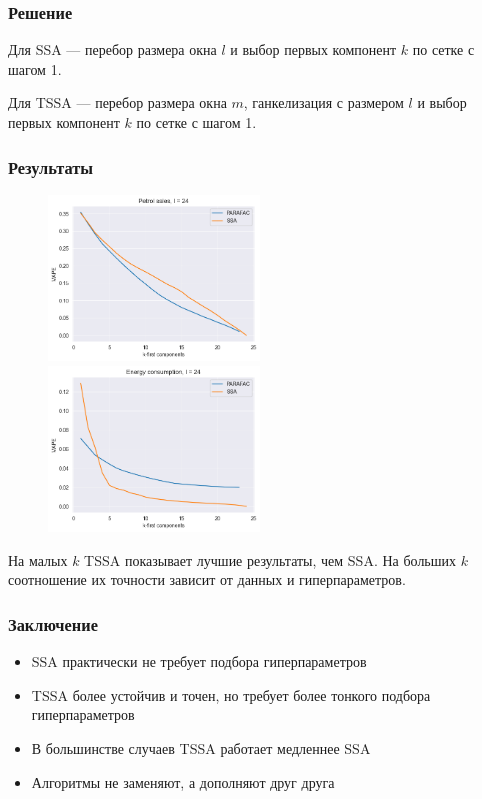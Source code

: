 \documentclass[
	11pt, %
]{beamer}
\begin{document}
\begin{frame}
    \frametitle{Решение}

Для SSA --- перебор размера окна \(l\) и выбор первых компонент \(k\) по сетке с шагом 1.

Для TSSA --- перебор размера окна \(m\), ганкелизация с размером \(l\) и выбор первых компонент \(k\) по сетке с шагом 1.

\end{frame}

\begin{frame}
	\frametitle{Результаты}

\begin{figure}
	\centering
	\includegraphics[width=0.5\textwidth]{images/result_good.png}%
	\includegraphics[width=0.5\textwidth]{images/result_bad.png}
	\label{fig:result}
\end{figure}

На малых \(k\) TSSA показывает лучшие результаты, чем SSA. На больших \(k\) соотношение их точности зависит от данных и гиперпараметров.

\end{frame}


\begin{frame}
	\frametitle{Заключение}

\begin{itemize}
	\item SSA практически не требует подбора гиперпараметров
    \item TSSA более устойчив и точен, но требует более тонкого подбора гиперпараметров
    \item В большинстве случаев TSSA работает медленнее SSA
    \item Алгоритмы не заменяют, а дополняют друг друга
\end{itemize}

\end{frame}
\end{document}
